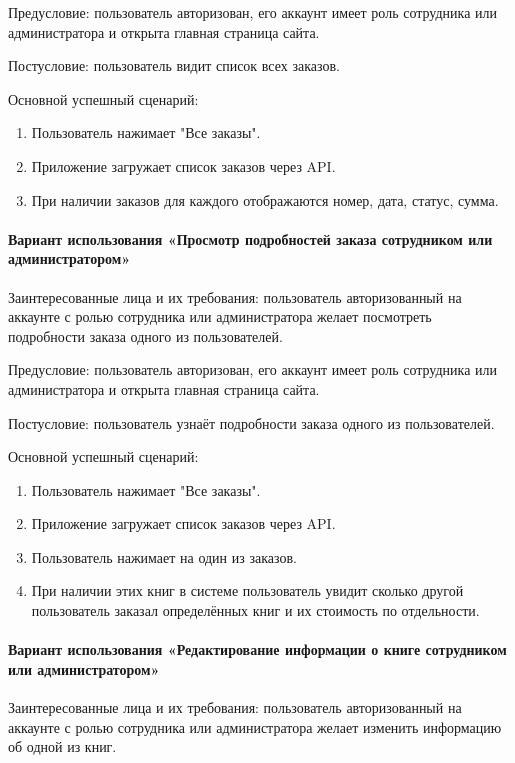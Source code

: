 Предусловие: пользователь авторизован, его аккаунт имеет роль сотрудника или администратора и открыта главная страница сайта.

Постусловие: пользователь видит список всех заказов.

Основной успешный сценарий:

\begin{enumerate}
	\item Пользователь нажимает "Все заказы".
	\item Приложение загружает список заказов через API.
	\item При наличии заказов для каждого отображаются номер, дата, статус, сумма.
\end{enumerate}


\paragraph{Вариант использования «Просмотр подробностей заказа сотрудником или администратором»}

Заинтересованные лица и их требования: пользователь авторизованный на аккаунте с ролью сотрудника или администратора желает посмотреть подробности заказа одного из пользователей.

Предусловие: пользователь авторизован, его аккаунт имеет роль сотрудника или администратора и открыта главная страница сайта.

Постусловие: пользователь узнаёт подробности заказа одного из пользователей.

Основной успешный сценарий:

\begin{enumerate}
	\item Пользователь нажимает "Все заказы".
	\item Приложение загружает список заказов через API.
	\item Пользователь нажимает на один из заказов.
	\item При наличии этих книг в системе пользователь увидит сколько другой пользователь заказал определённых книг и их стоимость по отдельности.
\end{enumerate}


\paragraph{Вариант использования «Редактирование информации о книге сотрудником или администратором»}

Заинтересованные лица и их требования: пользователь авторизованный на аккаунте с ролью сотрудника или администратора желает изменить информацию об одной из книг.

